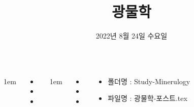 \documentclass[	20pt, 
							a1paper, 
							portrait, %
							margin=0mm, %
							innermargin=10mm,  		%
							colspace=5mm, 
							subcolspace=0mm
							]{tikzposter}
\title{광물학}
\author{ 2022년 8월 24일 수요일}
\begin{document}
	\maketitle

	\begin{columns}


			{
					\setlength{\leftmargini}{7em}
					\setlength{\labelsep} {1em}
				\begin{LARGE}
					\begin{itemize}
					\item 
					\item 
					\item 
					\end{itemize}
				\end{LARGE}
			}





			{
					\setlength{\leftmargini}{4em}
					\setlength{\labelsep} {1em}
				\begin{LARGE}
					\begin{itemize}
					\item 
					\item 
					\item 
					\end{itemize}
				\end{LARGE}
			}


			{
				\begin{LARGE}
					\begin{itemize}
					\item 폴더명 : Study-Minerulogy
					\item 파일명 : 광물학-포스트.tex
					\end{itemize}
				\end{LARGE}
			}


	\end{columns}
\end{document}
